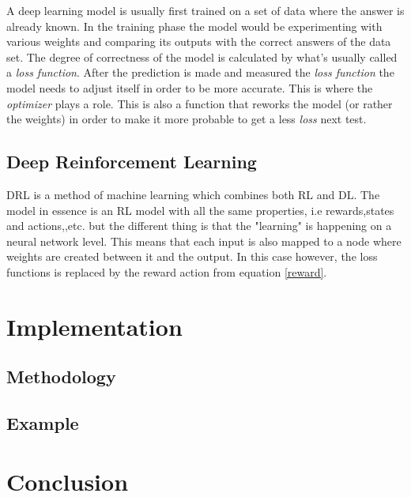 \documentclass[conference]{IEEEtran}
\begin{document}
A deep learning model is usually first trained on a set of data where the answer is already known. In the training phase the model would be experimenting with various weights and comparing its outputs with the correct answers of the data set. The degree of correctness of the model is calculated by what's usually called a \textit{loss function}\cite{chollet2021deep}. After the prediction is made and measured the \textit{loss function} the model needs to adjust itself in order to be more accurate. This is where the \textit{optimizer} plays a role. This is also a function that reworks the model (or rather the weights) in order to make it more probable to get a less \textit{loss} next test.
\subsection{Deep Reinforcement Learning}

DRL is a method of machine learning which combines both RL and DL. The model in essence is an RL model with all the same properties, i.e rewards,states and actions,,etc. but the different thing is that the "learning" is happening on a neural network level. This means that each input is also mapped to a node where weights are created between it and the output. In this case however, the loss functions is replaced by the reward action from equation \ref{reward}. 
\section{Implementation}

\subsection{Methodology}

\subsection{Example}

\section{Conclusion}
 

\end{document}
